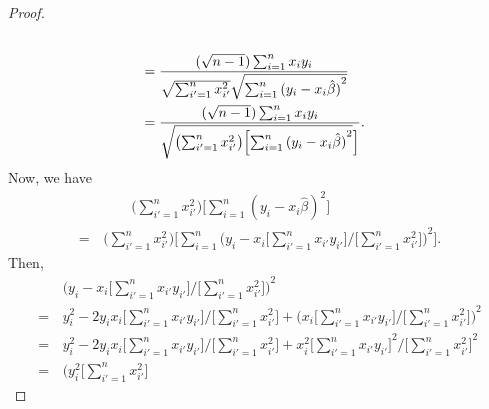 \begin{itemize}
\begin{proof}
\begin{equation*}
\begin{split}
{                        } \\
                    &= \frac{(\sqrt{n - 1})\sum_{i=1}^n x_i y_i}
                        {
                            \sqrt{\sum_{i'=1}^n x_{i'}^2}
                            \sqrt{\sum_{i=1}^n {(y_i - x_i\hat{\beta})}^2}
                        } \\
                    &= \frac{(\sqrt{n - 1})\sum_{i=1}^n x_i y_i}
                        {
                            \sqrt{\bigl(\sum_{i'=1}^n x_{i'}^2\bigr)
                            \Bigl[\sum_{i=1}^n {(y_i - x_i\hat{\beta})}^2}\Bigr]
                        }.
                \end{split}
            \end{equation*}
            Now, we have
            \begin{equation*}
                \begin{split}
                    &\qquad \Biggl(\sum_{i'=1}^n x_{i'}^2\Biggr)
                    \Biggl[\sum_{i=1}^n {(y_i - x_i\hat{\beta})}^2\Biggr] \\
                    = \, &\Biggl(\sum_{i'=1}^n x_{i'}^2\Biggr) 
                    \Biggl[\sum_{i=1}^n {\Biggl(y_i - x_i 
                        \Biggl[\sum_{i'=1}^n x_{i'}y_{i'}\Biggr] / 
                        \Biggl[\sum_{i'=1}^n x_{i'}^2\Biggr]\Biggr)}^2
                    \Biggr].
                \end{split}
            \end{equation*}
            Then,
            \begin{equation*}
                \begin{split}
                    &{\Biggl(y_i - x_i 
                        \Biggl[\sum_{i'=1}^n x_{i'}y_{i'}\Biggr] / 
                        \Biggl[\sum_{i'=1}^n x_{i'}^2\Biggr]\Biggr)}^2 \\
                    = \, &y_i^2 - 2y_ix_i \Biggl[\sum_{i'=1}^n x_{i'}y_{i'}\Biggr] / 
                        \Biggl[\sum_{i'=1}^n x_{i'}^2\Biggr]
                        + {\Biggl(x_i \Biggl[\sum_{i'=1}^n x_{i'}y_{i'}\Biggr] / 
                        \Biggl[\sum_{i'=1}^n x_{i'}^2\Biggr]\Biggr)}^2 \\
                    = \, &y_i^2 - 2y_ix_i \Biggl[\sum_{i'=1}^n x_{i'}y_{i'}\Biggr] / 
                        \Biggl[\sum_{i'=1}^n x_{i'}^2\Biggr]
                        + x_i^2 {\Biggl[\sum_{i'=1}^n x_{i'}y_{i'}\Biggr]}^2 / 
                        {\Biggl[\sum_{i'=1}^n x_{i'}^2\Biggr]}^2 \\
                    = \, &\Biggl(y_i^2\Biggl[\sum_{i'=1}^n x_{i'}^2\Biggr] 

\end{split}
\end{equation*}
\end{proof}
\end{itemize}
